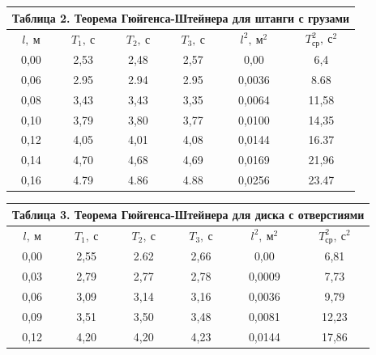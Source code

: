 \documentclass[a4paper,14pt]{article}
\begin{document}
    \begin{center}
        \begin{tabular}{|c|c|c|c|c|c|}
            \multicolumn{6}{c}{Таблица 2. Теорема Гюйгенса-Штейнера для штанги с грузами } \bigstrut[b]\\
            \hline
            $l,\ \text{м}$  & $T_{1},\ \text{с}$ & $T_{2},\ \text{с}$ & $T_{3},\ \text{с}$ & $l^2,\ \text{м}^2$ & $T_{\text{ср}}^2,\ \text{с}^2$ \bigstrut\\
            \hline
            0,00  & 2,53  & 2,48  & 2,57  & 0,00  & 6,4 \bigstrut\\
            \hline
            0,06  & 2.95  & 2.94  & 2.95  & 0,0036  & 8.68 \bigstrut\\
            \hline
            0,08  & 3,43  & 3,43  & 3,35  & 0,0064  & 11,58 \bigstrut\\
            \hline
            0,10  & 3,79  & 3,80  & 3,77  & 0,0100  & 14,35 \bigstrut\\
            \hline
            0,12  & 4,05  & 4,01  & 4,08  & 0,0144  & 16.37 \bigstrut\\
            \hline
            0,14  & 4,70  & 4,68  & 4,69  & 0,0169  & 21,96 \bigstrut\\
            \hline
            0,16  & 4.79  & 4.86  & 4.88  & 0,0256  & 23.47 \bigstrut\\
            \hline
        \end{tabular}%
    \end{center}%

    \begin{center}
        \begin{tabular}{|c|c|c|c|c|c|}
            \multicolumn{6}{c}{Таблица 3. Теорема Гюйгенса-Штейнера для диска с отверстиями} \bigstrut\\
            \hline
            $l,\ \text{м}$  & $T_{1},\ \text{с}$ & $T_{2},\ \text{с}$ & $T_{3},\ \text{с}$ & $l^2,\ \text{м}^2$ & $T_{\text{ср}}^2,\ \text{с}^2$ \bigstrut\\
            \hline
            0,00  & 2,55  & 2.62  & 2,66  & 0,00  & 6,81 \bigstrut\\
            \hline
            0,03  & 2,79  & 2,77  & 2,78  & 0,0009  & 7,73 \bigstrut\\
            \hline
            0,06  & 3,09  & 3,14  & 3,16  & 0,0036  & 9,79 \bigstrut\\
            \hline
            0,09  & 3,51  & 3,50  & 3,48  & 0,0081  & 12,23 \bigstrut\\
            \hline
            0,12  & 4,20  & 4,20  & 4,23  & 0,0144  & 17,86 \bigstrut\\
            \hline
        \end{tabular}%
    \end{center}%
\end{document}
